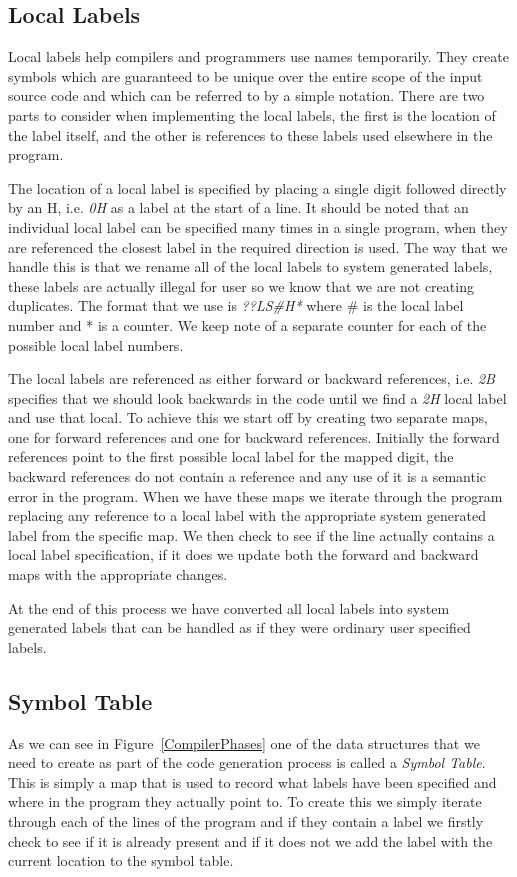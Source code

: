 \documentclass[a4paper,11pt]{report}
\begin{document}
\subsection{Local Labels}
Local labels help compilers and programmers use names temporarily. They create symbols which are guaranteed to be unique over the entire scope of the input source code and which can be referred to by a simple notation. There are two parts to consider when implementing the local labels, the first is the location of the label itself, and the other is references to these labels used elsewhere in the program.

The location of a local label is specified by placing a single digit followed directly by an H, i.e. \textit{0H} as a label at the start of a line. It should be noted that an individual local label can be specified many times in a single program, when they are referenced the closest label in the required direction is used. The way that we handle this is that we rename all of the local labels to system generated labels, these labels are actually illegal for user so we know that we are not creating duplicates. The format that we use is \textit{??LS\#H*} where \# is the local label number and * is a counter. We keep note of a separate counter for each of the possible local label numbers.

The local labels are referenced as either forward or backward references, i.e. \textit{2B} specifies that we should look backwards in the code until we find a \textit{2H} local label and use that local. To achieve this we start off by creating two separate maps, one for forward references and one for backward references. Initially the forward references point to the first possible local label for the mapped digit, the backward references do not contain a reference and any use of it is a semantic error in the program. When we have these maps we iterate through the program replacing any reference to a local label with the appropriate system generated label from the specific map. We then check to see if the line actually contains a local label specification, if it does we update both the forward and backward maps with the appropriate changes. 

At the end of this process we have converted all local labels into system generated labels that can be handled as if they were ordinary user specified labels.
\subsection{Symbol Table}
As we can see in Figure~\ref{CompilerPhases} one of the data structures that we need to create as part of the code generation process is called a \textit{Symbol Table}. This is simply a map that is used to record what labels have been specified and where in the program they actually point to. To create this we simply iterate through each of the lines of the program and if they contain a label we firstly check to see if it is already present and if it does not we add the label with the current location to the symbol table.
\end{document}
